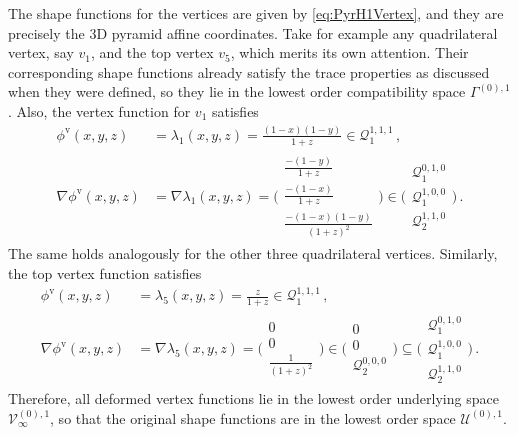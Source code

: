 The shape functions for the vertices are given by \eqref{eq:PyrH1Vertex}, and they are precisely the 3D pyramid affine coordinates.
Take for example any quadrilateral vertex, say $v_1$, and the top vertex $v_5$, which merits its own attention.
Their corresponding shape functions already satisfy the trace properties as discussed when they were defined, so they lie in the lowest order compatibility space $\Gamma^{(0),1}$.
Also, the vertex function for $v_1$ satisfies
\begin{equation}
\begin{aligned}
	\phi^\mathrm{v}(x,y,z)&=\lambda_1(x,y,z)=\textstyle{\frac{(1-x)(1-y)}{1+z}}\in\mathcal{Q}_1^{1,1,1}\,,\\
		\nabla\phi^\mathrm{v}(x,y,z)&=\nabla\lambda_1(x,y,z)
			=\Bigg(\begin{smallmatrix}\frac{-(1-y)}{1+z}\\\frac{-(1-x)}{1+z}\\\frac{-(1-x)(1-y)}{(1+z)^2}\end{smallmatrix}\Bigg)
				\in\Bigg(\begin{smallmatrix}\mathcal{Q}_1^{0,1,0}\\[2pt]\mathcal{Q}_1^{1,0,0}\\[2pt]
					\mathcal{Q}_2^{1,1,0}\end{smallmatrix}\Bigg)\,.
	\label{eq:PyrQuadVertexProof}
\end{aligned}
\end{equation}
The same holds analogously for the other three quadrilateral vertices.
Similarly, the top vertex function satisfies
\begin{equation}
\begin{aligned}
	\phi^\mathrm{v}(x,y,z)&=\lambda_5(x,y,z)=\textstyle{\frac{z}{1+z}}\in\mathcal{Q}_1^{1,1,1}\,,\\
		\nabla\phi^\mathrm{v}(x,y,z)&=\nabla\lambda_5(x,y,z)
			=\Bigg(\begin{smallmatrix}0\\[2pt]0\\[2pt]\frac{1}{(1+z)^2}\end{smallmatrix}\Bigg)
				\in\Bigg(\begin{smallmatrix}0\\[2pt]0\\[2pt]
					\mathcal{Q}_2^{0,0,0}\end{smallmatrix}\Bigg)
						\subseteq\Bigg(\begin{smallmatrix}\mathcal{Q}_1^{0,1,0}\\[2pt]\mathcal{Q}_1^{1,0,0}\\[2pt]
							\mathcal{Q}_2^{1,1,0}\end{smallmatrix}\Bigg)\,.
	\label{eq:PyrTopVertexProof}
\end{aligned}
\end{equation}
Therefore, all deformed vertex functions lie in the lowest order underlying space $\mathcal{V}_\infty^{(0),1}$, so that the original shape functions are in the lowest order space $\mathcal{U}^{(0),1}$.

